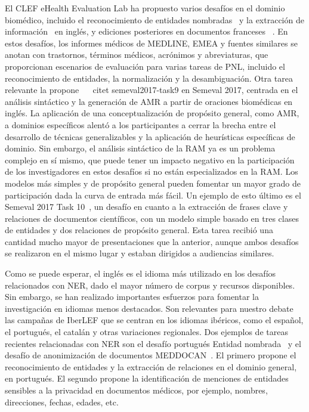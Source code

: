 El CLEF eHealth Evaluation Lab ha propuesto varios desafíos en el dominio biomédico, incluido el reconocimiento de entidades nombradas~\cite{clef2013} y la extracción de información~\cite{clef2014} en inglés, y ediciones posteriores en documentos franceses~\cite{clef2015, clef2016} . En estos desafíos, los informes médicos de MEDLINE, EMEA y fuentes similares se anotan con trastornos, términos médicos, acrónimos y abreviaturas, que proporcionan escenarios de evaluación para varias tareas de PNL, incluido el reconocimiento de entidades, la normalización y la desambiguación. Otra tarea relevante la propone ~ \ citet {semeval2017-task9} en Semeval 2017, centrada en el análisis sintáctico y la generación de AMR a partir de oraciones biomédicas en inglés. La aplicación de una conceptualización de propósito general, como AMR, a dominios específicos alentó a los participantes a cerrar la brecha entre el desarrollo de técnicas generalizables y la aplicación de heurísticas específicas de dominio. Sin embargo, el análisis sintáctico de la RAM ya es un problema complejo en sí mismo, que puede tener un impacto negativo en la participación de los investigadores en estos desafíos si no están especializados en la RAM. Los modelos más simples y de propósito general pueden fomentar un mayor grado de participación dada la curva de entrada más fácil. Un ejemplo de esto último es el Semeval 2017 Task 10~\cite{semeval2017-task10}, un desafío en cuanto a la extracción de frases clave y relaciones de documentos científicos, con un modelo simple basado en tres clases de entidades y dos relaciones de propósito general. Esta tarea recibió una cantidad mucho mayor de presentaciones que la anterior, aunque ambos desafíos se realizaron en el mismo lugar y estaban dirigidos a audiencias similares.

Como se puede esperar, el inglés es el idioma más utilizado en los desafíos relacionados con NER, dado el mayor número de corpus y recursos disponibles. Sin embargo, se han realizado importantes esfuerzos para fomentar la investigación en idiomas menos destacados. Son relevantes para nuestro debate las campañas de IberLEF que se centran en los idiomas ibéricos, como el español, el portugués, el catalán y otras variaciones regionales. Dos ejemplos de tareas recientes relacionadas con NER son el desafío portugués Entidad nombrada~\cite{glauber2019iberlef} y el desafío de anonimización de documentos MEDDOCAN~\cite{marimon2019automatic}. El primero propone el reconocimiento de entidades y la extracción de relaciones en el dominio general, en portugués. El segundo propone la identificación de menciones de entidades sensibles a la privacidad en documentos médicos, por ejemplo, nombres, direcciones, fechas, edades, etc.

